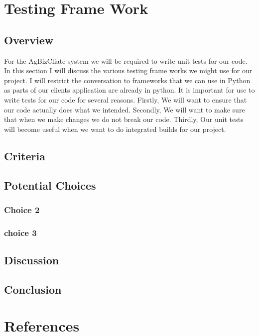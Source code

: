 \documentclass[letterpaper,10pt]{article}
\begin{document}
	
\section{Testing Frame Work}
		\subsection{Overview}
						For the AgBizCliate system we will be required to write unit tests for our code. In this section I will discuss the various testing frame works we might use for our project. I will restrict the conversation to frameworks that we can use in Python as parts of our clients application are already in python. It is important for use to write tests for our code for several reasons. Firstly, We will want to ensure that our code actually does what we intended. Secondly, We will want to make sure that when we make changes we do not break our code. Thirdly, Our unit tests will become useful when we want to do integrated builds for our project.

	
	\subsection{Criteria}
	
	\subsection{Potential Choices}
		\subsubsection{}
		
		\subsubsection{Choice 2}
		
		\subsubsection{choice 3}
		
	\subsection{Discussion}
	
	\subsection{Conclusion}
	
\section{References}
\end{document}
